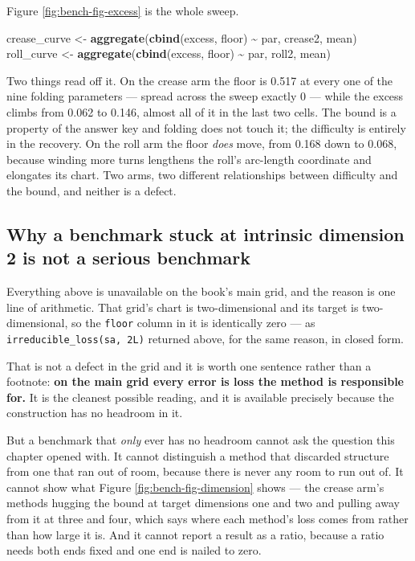 \documentclass[
  british,
  a4paper,
]{book}
\newenvironment{Shaded}{\begin{snugshade}}{\end{snugshade}}
\newcommand{\FunctionTok}[1]{\textcolor[rgb]{0.13,0.29,0.53}{\textbf{#1}}}
\newcommand{\NormalTok}[1]{#1}
\newcommand{\OtherTok}[1]{\textcolor[rgb]{0.56,0.35,0.01}{#1}}
\newcommand{\SpecialCharTok}[1]{\textcolor[rgb]{0.81,0.36,0.00}{\textbf{#1}}}
\begin{document}
Figure \ref{fig:bench-fig-excess} is the whole sweep.

\begin{Shaded}
\begin{Highlighting}[]
\NormalTok{crease\_curve }\OtherTok{\textless{}{-}} \FunctionTok{aggregate}\NormalTok{(}\FunctionTok{cbind}\NormalTok{(excess, floor) }\SpecialCharTok{\textasciitilde{}}\NormalTok{ par, crease2, mean)}
\NormalTok{roll\_curve   }\OtherTok{\textless{}{-}} \FunctionTok{aggregate}\NormalTok{(}\FunctionTok{cbind}\NormalTok{(excess, floor) }\SpecialCharTok{\textasciitilde{}}\NormalTok{ par, roll2, mean)}
\end{Highlighting}
\end{Shaded}

Two things read off it. On the crease arm the floor is
0.517 at every one of the nine folding
parameters --- spread across the sweep exactly
0 --- while the excess climbs from
0.062 to
0.146, almost all of it in the last two cells.
The bound is a property of the answer key and folding does not touch it; the
difficulty is entirely in the recovery. On the roll arm the floor \emph{does} move,
from 0.168 down to
0.068, because winding more turns lengthens the
roll's arc-length coordinate and elongates its chart. Two arms, two different
relationships between difficulty and the bound, and neither is a defect.

\subsection{Why a benchmark stuck at intrinsic dimension 2 is not a serious benchmark}\label{why-a-benchmark-stuck-at-intrinsic-dimension-2-is-not-a-serious-benchmark}

Everything above is unavailable on the book's main grid, and the reason is one
line of arithmetic. That grid's chart is two-dimensional and its target is
two-dimensional, so the \texttt{floor} column in it is identically zero --- as
\texttt{irreducible\_loss(sa,\ 2L)} returned above, for the same reason, in closed form.

That is not a defect in the grid and it is worth one sentence rather than a
footnote: \textbf{on the main grid every error is loss the method is responsible
for.} It is the cleanest possible reading, and it is available precisely
because the construction has no headroom in it.

But a benchmark that \emph{only} ever has no headroom cannot ask the question this
chapter opened with. It cannot distinguish a method that discarded structure
from one that ran out of room, because there is never any room to run out of. It
cannot show what Figure \ref{fig:bench-fig-dimension} shows --- the crease arm's
methods hugging the bound at target dimensions one and two and pulling away from
it at three and four, which says where each method's loss comes from rather than
how large it is. And it cannot report a result as a ratio, because a ratio needs
both ends fixed and one end is nailed to zero.
\end{document}
